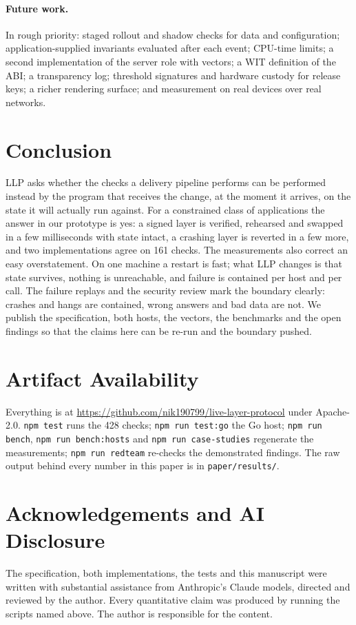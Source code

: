 \documentclass[10pt,twocolumn]{article}
\newcommand{\repo}{\url{https://github.com/nik190799/live-layer-protocol}}
\newcommand{\code}[1]{\texttt{#1}}
\begin{document}
\paragraph{Future work.} In rough priority: staged rollout and shadow checks for data and
configuration; application-supplied invariants evaluated after each event; CPU-time limits; a
second implementation of the server role with vectors; a WIT definition of the ABI; a transparency
log; threshold signatures and hardware custody for release keys; a richer rendering surface; and
measurement on real devices over real networks.

\section{Conclusion}

LLP asks whether the checks a delivery pipeline performs can be performed instead by the program
that receives the change, at the moment it arrives, on the state it will actually run against.
For a constrained class of applications the answer in our prototype is yes: a signed layer is
verified, rehearsed and swapped in a few milliseconds with state intact, a crashing layer is
reverted in a few more, and two implementations agree on 161 checks. The measurements also correct
an easy overstatement. On one machine a restart is fast; what LLP changes is that state survives,
nothing is unreachable, and failure is contained per host and per call. The failure replays and
the security review mark the boundary clearly: crashes and hangs are contained, wrong answers and
bad data are not. We publish the specification, both hosts, the vectors, the benchmarks and the
open findings so that the claims here can be re-run and the boundary pushed.

\section*{Artifact Availability}

Everything is at \repo{} under Apache-2.0. \code{npm test} runs the 428 checks;
\code{npm run test:go} the Go host; \code{npm run bench}, \code{npm run bench:hosts} and
\code{npm run case-studies} regenerate the measurements; \code{npm run redteam} re-checks the
demonstrated findings. The raw output behind every number in this paper is in
\code{paper/results/}.

\section*{Acknowledgements and AI Disclosure}

The specification, both implementations, the tests and this manuscript were written with
substantial assistance from Anthropic's Claude models, directed and reviewed by the author. Every
quantitative claim was produced by running the scripts named above. The author is responsible for
the content.



\end{document}

